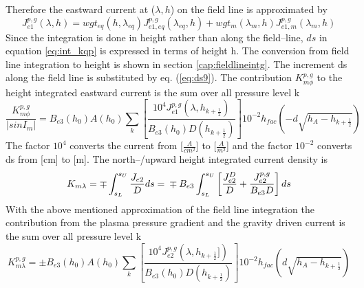 Therefore the eastward current  at ($\lambda, h$) on the
field line is approximated by
%
\begin{equation}
 {J}_{e1}^{p,g}(\lambda, h) = wgt_{eq}(h,\lambda_{eq}){J}_{e1,eq}^{p,g}(\lambda_{eq}, h)  + 
            wgt_m(\lambda_m, h) {J}_{e1,m}^{p,g}(\lambda_m, h) \label{eq:approx_fl_j1}
\end{equation}
%
Since the integration is done in height rather than along the field--line,
$ds$ in equation \ref{eq:int_kqp} is expressed in terms of height h.
%
The conversion from field line integration to height is shown in section \ref{cap:fieldlineintg}.
The increment ds along the field line is substituted by eq. (\ref{eq:ds9}).
%
The contribution $K_{m\phi}^{p,g}$ to the height integrated eastward current is the sum over 
all pressure level k
%
\begin{equation}
  \frac{K_{m\phi}^{p,g}}{|sin I_m|} =  
  B_{e3}(h_0) A(h_0) \sum_k  \left[ 
              \frac{10^4 {J}_{e1}^{p,g}(\lambda, h_{k+\frac{1}{2}}) }{B_{e3}(h_0) D(h_{k+\frac{1}{2}})}  \right]  
	     10^{-2} h_{fac}(- d\sqrt{h_A-h_{k+\frac{1}{2}}} )\label{eq:intdes_kqp}
\end{equation}
%
The factor $10^4$ converts the current from [$\frac{A}{cm^2}$] to [$\frac{A}{m^2}$] and
the factor $10^{-2}$ converts ds from [cm] to [m].
%
The north--/upward height integrated current density is
%
\begin{equation}
  K_{m\lambda} = \mp \int_{s_L}^{s_U} \frac{{J}_{e2}}{D} ds  = \\
 \mp  B_{e3}  \int_{s_L}^{s_U} \left[ \frac{{J}_{e2}^D}{D} +
              \frac{{J}_{e2}^{p,g}}{B_{e3} D}  \right] ds\label{eq:int_kql}
\end{equation}
%
With the above mentioned approximation of the field line integration the contribution
from the plasma pressure gradient and the gravity driven current is the sum over 
all pressure level k
%
\begin{equation}
  K_{m\lambda}^{p,g} = \pm  
  B_{e3}(h_0) A(h_0) \sum_k  \left[ 
              \frac{10^4 {J}_{e2}^{p,g}(\lambda, h_{k+\frac{1}{2}}]) }{B_{e3}(h_0) D(h_{k+\frac{1}{2}})}  \right]  
	    10^{-2} h_{fac} (d\sqrt{h_A-h_{k+\frac{1}{2}}} )\label{eq:intdes_kql}
\end{equation}
